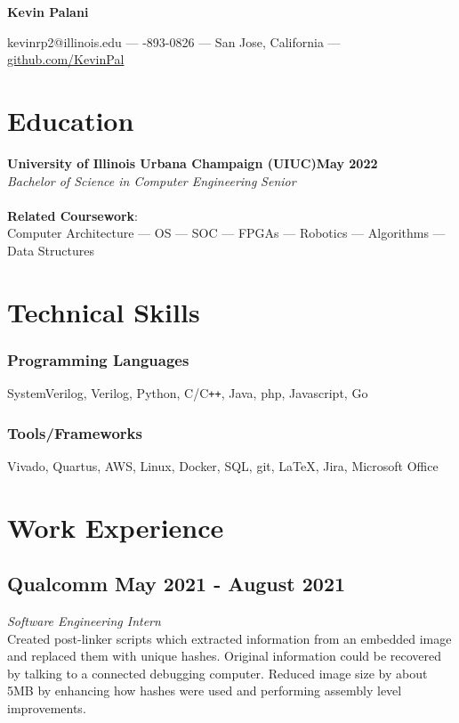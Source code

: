 \documentclass[letterpaper,11pt]{article}
\makeatletter
\newcommand\textbox[1]{%
    \parbox{.333\textwidth}{#1}%
}
\renewcommand{\maketitle}{
    \begin{center}
        \noindent\textbox{\hfill}\textbox{\hfil\bfseries\huge Kevin Palani \hfil}\vspace{3mm}\textbox{\hfill}
        {\faEnvelope \enskip kevinrp2@illinois.edu --- \faPhone \enskip 408-893-0826 --- \faHome \enskip San Jose, California --- \faGithub \enskip \underline{\href{https://github.com/KevinPal}{github.com/KevinPal}}}
    \end{center} }
\makeatother
\begin{document}
\maketitle
\section{Education}
    {\textbf{University of Illinois Urbana Champaign (UIUC)}}\null\hfill\textbf{May 2022}\\
    \emph{Bachelor of Science in Computer Engineering} \null\hfill \emph{Senior}\\
    \vspace*{-4mm}\\
    \textbf{Related Coursework}:\\ Computer Architecture --- OS --- SOC --- FPGAs --- Robotics --- Algorithms --- Data Structures
\section{Technical Skills}
    \subsubsection{Programming Languages}
    SystemVerilog, Verilog, Python, C/C\verb!++!, Java, php, Javascript, Go
    \vspace*{-5mm}
    \subsubsection{Tools/Frameworks}
    Vivado, Quartus, AWS, Linux, Docker, SQL, git, \LaTeX, Jira, Microsoft Office
    \vspace*{-5mm}
\vspace*{4mm}
\section{Work Experience}
    \subsection{Qualcomm \null\hfill May 2021 - August 2021}
    \vspace*{-2mm}
    \emph{Software Engineering Intern} \null\hfill \emph{}\\
    Created post-linker scripts which extracted information from an embedded image and replaced them with unique hashes. Original information could be recovered by talking to a connected debugging computer. Reduced image size by about 5MB by enhancing how hashes were used and performing assembly level improvements. 
    \vspace*{-2mm}
\end{document}
